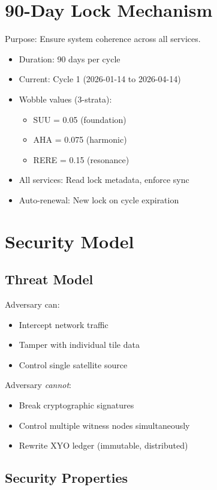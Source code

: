 \documentclass[11pt]{article}
\begin{document}
\section{90-Day Lock Mechanism}

Purpose: Ensure system coherence across all services.

\begin{itemize}
    \item Duration: 90 days per cycle
    \item Current: Cycle 1 (2026-01-14 to 2026-04-14)
    \item Wobble values (3-strata):
    \begin{itemize}
        \item SUU = 0.05 (foundation)
        \item AHA = 0.075 (harmonic)
        \item RERE = 0.15 (resonance)
    \end{itemize}
    \item All services: Read lock metadata, enforce sync
    \item Auto-renewal: New lock on cycle expiration
\end{itemize}

\section{Security Model}

\subsection{Threat Model}

Adversary can:
\begin{itemize}
    \item Intercept network traffic
    \item Tamper with individual tile data
    \item Control single satellite source
\end{itemize}

Adversary \textit{cannot}:
\begin{itemize}
    \item Break cryptographic signatures
    \item Control multiple witness nodes simultaneously
    \item Rewrite XYO ledger (immutable, distributed)
\end{itemize}

\subsection{Security Properties}
\end{document}
